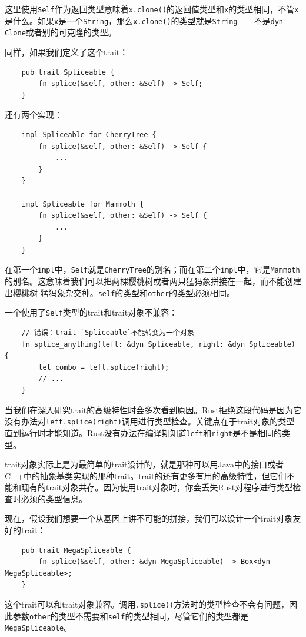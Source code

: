 这里使用\texttt{Self}作为返回类型意味着\texttt{x.clone()}的返回值类型和\texttt{x}的类型相同，不管\texttt{x}是什么。如果\texttt{x}是一个\texttt{String}，那么\texttt{x.clone()}的类型就是\texttt{String}——不是\texttt{dyn Clone}或者别的可克隆的类型。

同样，如果我们定义了这个trait：
\begin{verbatim}
    pub trait Spliceable {
        fn splice(&self, other: &Self) -> Self;
    }
\end{verbatim}
还有两个实现：
\begin{verbatim}
    impl Spliceable for CherryTree {
        fn splice(&self, other: &Self) -> Self {
            ...
        }
    }

    impl Spliceable for Mammoth {
        fn splice(&self, other: &Self) -> Self {
            ...
        }
    }    
\end{verbatim}

在第一个\texttt{impl}中，\texttt{Self}就是\texttt{CherryTree}的别名；而在第二个\texttt{impl}中，它是\texttt{Mammoth}的别名。这意味着我们可以把两棵樱桃树或者两只猛犸象拼接在一起，而不能创建出樱桃树-猛犸象杂交种。\texttt{self}的类型和\texttt{other}的类型必须相同。

一个使用了\texttt{Self}类型的trait和trait对象不兼容：
\begin{verbatim}
    // 错误：trait `Spliceable`不能转变为一个对象
    fn splice_anything(left: &dyn Spliceable, right: &dyn Spliceable) {
        let combo = left.splice(right);
        // ...
    }
\end{verbatim}

当我们在深入研究trait的高级特性时会多次看到原因。Rust拒绝这段代码是因为它没有办法对\texttt{left.splice(right)}调用进行类型检查。关键点在于trait对象的类型直到运行时才能知道。Rust没有办法在编译期知道\texttt{left}和\texttt{right}是不是相同的类型。

trait对象实际上是为最简单的trait设计的，就是那种可以用Java中的接口或者C++中的抽象基类实现的那种trait。trait的还有更多有用的高级特性，但它们不能和现有的trait对象共存。因为使用trait对象时，你会丢失Rust对程序进行类型检查时必须的类型信息。

现在，假设我们想要一个从基因上讲不可能的拼接，我们可以设计一个trait对象友好的trait：
\begin{verbatim}
    pub trait MegaSpliceable {
        fn splice(&self, other: &dyn MegaSpliceable) -> Box<dyn MegaSpliceable>;
    }
\end{verbatim}

这个trait可以和trait对象兼容。调用\texttt{.splice()}方法时的类型检查不会有问题，因此参数\texttt{other}的类型不需要和\texttt{self}的类型相同，尽管它们的类型都是\texttt{MegaSpliceable}。

